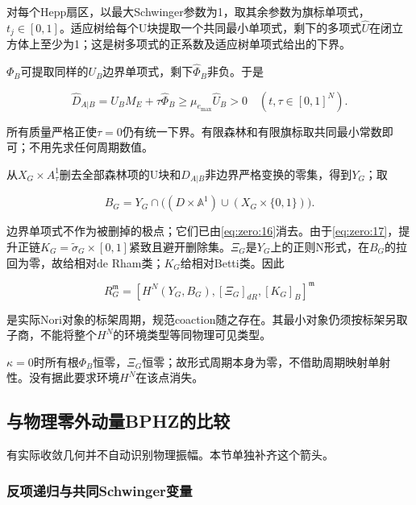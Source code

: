 \documentclass[11pt,a4paper,oneside]{ctexart}
\theoremstyle{cnplain}
\theoremstyle{definition}
\theoremstyle{remark}
\numberwithin{equation}{section}
\begin{document}
对每个Hepp扇区，以最大Schwinger参数为1，取其余参数为旗标单项式，\(t_j\in [0,1]\)。适应树给每个U块提取一个共同最小单项式，剩下的多项式\(\widehat U\)在闭立方体上至少为1；这是树多项式的正系数及适应树单项式给出的下界。

\(\Phi _B\)可提取同样的\(U_B\)边界单项式，剩下\(\widehat \Phi _B\)非负。于是

\begin{equation}
\widehat D_{A|B}
    =\widehat U_B M_E+\tau\widehat\Phi_B
       \geq\mu_{e_{\max}}\widehat U_B>0
           \quad (t,\tau\in[0,1]^{N}).                        \label{eq:zero:17}
\end{equation}

所有质量严格正使\(\tau =0\)仍有统一下界。有限森林和有限旗标取共同最小常数即可；不用先求任何周期数值。

从\(X_G\times A^{1}_\tau \)删去全部森林项的U块和\(D_{A|B}\)非边界严格变换的零集，得到\(Y_G\)；取

\begin{equation}
B_G=Y_G\cap\bigl((D\times\mathbb A^1)
                  \cup(X_G\times\{0,1\})\bigr).              \label{eq:zero:18}
\end{equation}

边界单项式不作为被删掉的极点；它们已由\eqref{eq:zero:16}消去。由于\eqref{eq:zero:17}，提升正链\(K_G=\widetilde\sigma _G\times [0,1]\)紧致且避开删除集。\(\Xi _G\)是\(Y_G\)上的正则N形式，在\(B_G\)的拉回为零，故给相对de Rham类；\(K_G\)给相对Betti类。因此

\begin{equation}
R_G^{\mathfrak m}
  =[H^N(Y_G,B_G),[\Xi_G]_{dR},[K_G]_B]^{\mathfrak m}           \label{eq:zero:19}
\end{equation}

是实际Nori对象的标架周期，规范coaction随之存在。其最小对象仍须按标架另取子商，不能将整个\(H^N\)的环境类型等同物理可见类型。

\(\kappa =0\)时所有根\(\Phi _B\)恒零，\(\Xi _G\)恒零；故形式周期本身为零，不借助周期映射单射性。没有据此要求环境\(H^N\)在该点消失。


\subsection{与物理零外动量BPHZ的比较}\label{sec:zero:8}

有实际收敛几何并不自动识别物理振幅。本节单独补齐这个箭头。

\subsubsection{反项递归与共同Schwinger变量}\label{sec:zero:8.1}
\end{document}
